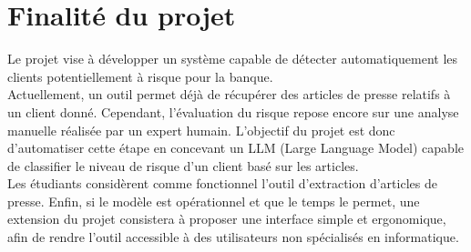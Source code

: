 \section{Finalité du projet}

Le projet vise à développer un système capable de détecter automatiquement les clients potentiellement à risque pour la banque. \\

Actuellement, un outil permet déjà de récupérer des articles de presse relatifs à un client donné. Cependant, l’évaluation du risque repose encore sur une analyse manuelle réalisée par un expert humain. L’objectif du projet est donc d’automatiser cette étape en concevant un LLM (Large Language Model) capable de classifier le niveau de risque d’un client basé sur les articles. \\

Les étudiants considèrent comme fonctionnel l’outil d’extraction d'articles de presse. Enfin, si le modèle est opérationnel et que le temps le permet, une extension du projet consistera à proposer une interface simple et ergonomique, afin de rendre l’outil accessible à des utilisateurs non spécialisés en informatique.